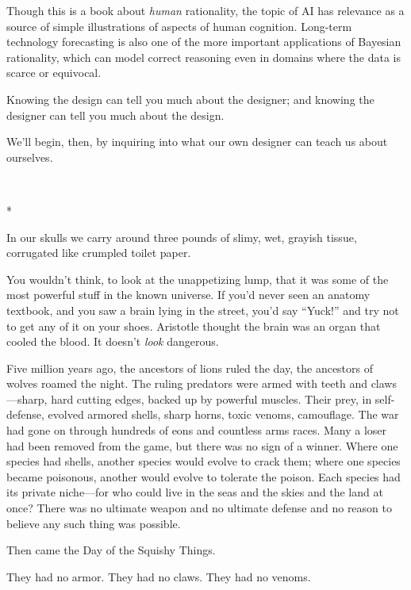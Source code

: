 {
 Though this is a book about \textit{human} rationality, the topic
of AI has relevance as a source of simple illustrations of aspects of
human cognition. Long-term technology forecasting is also one of the
more important applications of Bayesian rationality, which can model
correct reasoning even in domains where the data is scarce or
equivocal.}

{
 Knowing the design can tell you much about the designer; and
knowing the designer can tell you much about the design.}

{
 We'll begin, then, by inquiring into what our own
designer can teach us about ourselves.}

{
 ~}

{\centering
 *
\par}


\bigskip


{
 In our skulls we carry around three pounds of slimy, wet, grayish
tissue, corrugated like crumpled toilet paper.}

{
 You wouldn't think, to look at the unappetizing
lump, that it was some of the most powerful stuff in the known
universe. If you'd never seen an anatomy textbook, and
you saw a brain lying in the street, you'd say
``Yuck!'' and try not to get any of
it on your shoes. Aristotle thought the brain was an organ that cooled
the blood. It doesn't \textit{look} dangerous.}

{
 Five million years ago, the ancestors of lions ruled the day, the
ancestors of wolves roamed the night. The ruling predators were armed
with teeth and claws---sharp, hard cutting edges, backed up by powerful
muscles. Their prey, in self-defense, evolved armored shells, sharp
horns, toxic venoms, camouflage. The war had gone on through hundreds
of eons and countless arms races. Many a loser had been removed from
the game, but there was no sign of a winner. Where one species had
shells, another species would evolve to crack them; where one species
became poisonous, another would evolve to tolerate the poison. Each
species had its private niche---for who could live in the seas and the
skies and the land at once? There was no ultimate weapon and no
ultimate defense and no reason to believe any such thing was possible.}

{
 Then came the Day of the Squishy Things.}

{
 They had no armor. They had no claws. They had no venoms.}

